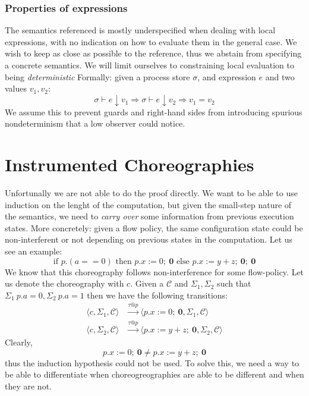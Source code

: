 \documentclass[12pt,a4paper,twoside]{book}
\begin{document}
\subsubsection{Properties of expressions}
The semantics referenced\cite{montesi2023introduction} is mostly underspecified when dealing with local expressions, with no indication on how to evaluate them in the general case.
We wish to keep as close as possible to the reference, thus we abstain from specifying a concrete semantics.
We will limit ourselves to constraining local evaluation to being \emph{deterministic}
Formally: given a process store $\sigma$, and expression $e$ and two values $v_1, v_2$:
$$
\sigma \vdash e \downarrow v_1 \Rightarrow
\sigma \vdash e \downarrow v_2 \Rightarrow v_1 = v_2
$$
We assume this to prevent guards and right-hand sides from introducing spurious nondeterminism that a low observer could notice.

\section{Instrumented Choreographies}
Unfortunally we are not able to do the proof directly. We want to be able to use induction on the lenght of the computation, but given the small-step nature of the semantics, we need to \emph{carry over} some information from previous execution states.
More concretely: given a flow policy, the same configuration state could be non-interferent or not depending on previous states in the computation. Let us see an example:
$$ \text{if } p.(a == 0) \text{ then } p.x := 0; ~ \boldsymbol{0} \text{ else } p.x := y + z; ~ \boldsymbol{0}; ~ \boldsymbol{0} $$
We know that this choreography follows non-interference for some flow-policy. Let us denote the choreography with $c$.
Given a $\mathscr{C}$ and $\Sigma_1, \Sigma_2$ such that $\Sigma_1~p.a = 0, \Sigma_2~p.a = 1$ then we have the following transitions:
\begin{align*}
	\langle c, \Sigma_1, \mathscr{C} \rangle &\xrightarrow{\tau @p}
	\langle p.x := 0;~ \boldsymbol{0}, \Sigma_1, \mathscr{C} \rangle \\
	\langle c, \Sigma_2, \mathscr{C} \rangle &\xrightarrow{\tau @p}
	\langle p.x := y + z;~ \boldsymbol{0}, \Sigma_2, \mathscr{C} \rangle
\end{align*}
Clearly, 
$$p.x := 0;~ \boldsymbol{0} \ne p.x := y + z;~ \boldsymbol{0}$$
thus the induction hypothesis could not be used. To solve this, we need a way to be able to differentiate when choreogreographies are able to be different and when they are not.
\end{document}
